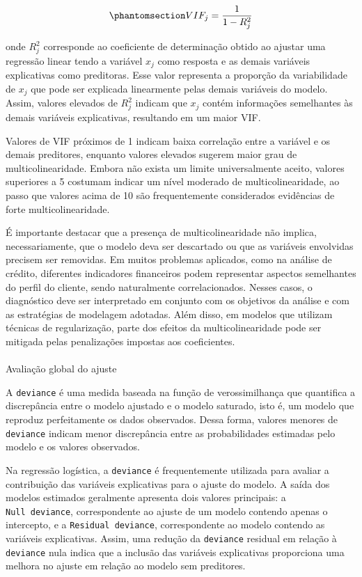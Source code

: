 \documentclass[
  brazilian,
  12pt,
  letterpaper,
  DIV=11,
  numbers=noendperiod]{scrartcl}
\makeatletter
\let\oldparagraph\paragraph
\renewcommand{\paragraph}{
    \@ifstar
      \xxxParagraphStar
      \xxxParagraphNoStar
  }
\newcommand{\xxxParagraphStar}[1]{\oldparagraph*{#1}\mbox{}}
\newcommand{\xxxParagraphNoStar}[1]{\oldparagraph{#1}\mbox{}}
\makeatother
\begin{document}
\begin{equation}\protect\phantomsection\label{eq-vif}{
VIF_j=
\frac{1}{1-R_j^2}
}\end{equation}

onde \(R_j^2\) corresponde ao coeficiente de determinação obtido ao
ajustar uma regressão linear tendo a variável \(x_j\) como resposta e as
demais variáveis explicativas como preditoras. Esse valor representa a
proporção da variabilidade de \(x_j\) que pode ser explicada linearmente
pelas demais variáveis do modelo. Assim, valores elevados de \(R_j^2\)
indicam que \(x_j\) contém informações semelhantes às demais variáveis
explicativas, resultando em um maior VIF.

Valores de VIF próximos de 1 indicam baixa correlação entre a variável e
os demais preditores, enquanto valores elevados sugerem maior grau de
multicolinearidade. Embora não exista um limite universalmente aceito,
valores superiores a 5 costumam indicar um nível moderado de
multicolinearidade, ao passo que valores acima de 10 são frequentemente
considerados evidências de forte multicolinearidade.

É importante destacar que a presença de multicolinearidade não implica,
necessariamente, que o modelo deva ser descartado ou que as variáveis
envolvidas precisem ser removidas. Em muitos problemas aplicados, como
na análise de crédito, diferentes indicadores financeiros podem
representar aspectos semelhantes do perfil do cliente, sendo
naturalmente correlacionados. Nesses casos, o diagnóstico deve ser
interpretado em conjunto com os objetivos da análise e com as
estratégias de modelagem adotadas. Além disso, em modelos que utilizam
técnicas de regularização, parte dos efeitos da multicolinearidade pode
ser mitigada pelas penalizações impostas aos coeficientes.

\paragraph{Avaliação global do
ajuste}\label{avaliauxe7uxe3o-global-do-ajuste}

A \texttt{deviance} é uma medida baseada na função de verossimilhança
que quantifica a discrepância entre o modelo ajustado e o modelo
saturado, isto é, um modelo que reproduz perfeitamente os dados
observados. Dessa forma, valores menores de \texttt{deviance} indicam
menor discrepância entre as probabilidades estimadas pelo modelo e os
valores observados.

Na regressão logística, a \texttt{deviance} é frequentemente utilizada
para avaliar a contribuição das variáveis explicativas para o ajuste do
modelo. A saída dos modelos estimados geralmente apresenta dois valores
principais: a \texttt{Null\ deviance}, correspondente ao ajuste de um
modelo contendo apenas o intercepto, e a \texttt{Residual\ deviance},
correspondente ao modelo contendo as variáveis explicativas. Assim, uma
redução da \texttt{deviance} residual em relação à \texttt{deviance}
nula indica que a inclusão das variáveis explicativas proporciona uma
melhora no ajuste em relação ao modelo sem preditores.
\end{document}
